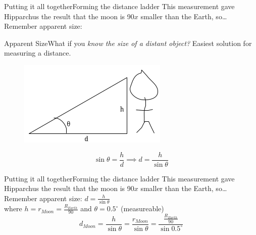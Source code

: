 \documentclass[12pt]{beamer}
\begin{document}
        \begin{frame}{Putting it all together}{Forming the distance ladder} \centering
            This measurement gave Hipparchus the result that the moon is 90$x$ smaller than the Earth, so\ldots \\ \vspace{1em}
            Remember apparent size:
        \end{frame}
        \begin{frame}{Apparent Size}{What if you \textit{know the size of a distant object?}} \centering
            Easiest solution for measuring a distance.
            \begin{figure}
                \includegraphics[scale=0.6, bb=0 0 280 160]{angletriangle.png}
            \end{figure}
            \[\sin{\theta}=\frac{h}{d} \implies d=\frac{h}{\sin{\theta}}\]
        \end{frame}
        \begin{frame}{Putting it all together}{Forming the distance ladder} \centering
            This measurement gave Hipparchus the result that the moon is 90$x$ smaller than the Earth, so\ldots \\ \vspace{1em}
            Remember apparent size: $d=\frac{h}{\sin{\theta}}$\\ \vspace{1em}
            where $h=r_{Moon}=\frac{R_{Earth}}{90}$ and $\theta=0.5^\circ$ (measureable)\\ \vspace{1.5em}
            \alert{\[d_{Moon}=\frac{h}{\sin{\theta}}=\frac{r_{Moon}}{\sin{\theta}}=\frac{\frac{R_{Earth}}{90}}{\sin{0.5^\circ}}\]}
        \end{frame}
\end{document}
